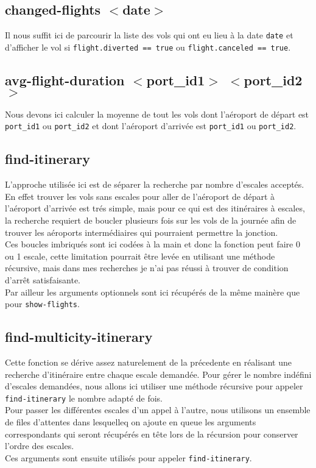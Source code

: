 \documentclass[a4paper, 12pt]{article}
\begin{document}
	\subsection{\texorpdfstring{changed-flights $<$date$>$}{}}
	Il nous suffit ici de parcourir la liste des vols qui ont eu lieu à la date \lstinline|date| et d'afficher le vol si \lstinline|flight.diverted == true| ou \lstinline|flight.canceled == true|.\\
	
	\subsection{\texorpdfstring{avg-flight-duration $<$port\_id1$>$ $<$port\_id2$>$}{}}
	Nous devons ici calculer la moyenne de tout les vols dont l'aéroport de départ est \lstinline|port_id1| ou \lstinline|port_id2| et dont l'aéroport d'arrivée est \lstinline|port_id1| ou \lstinline|port_id2|.
	
	\subsection{\texorpdfstring{find-itinerary}{PDFstring}}
	L'approche utilisée ici est de séparer la recherche par nombre d'escales acceptés. En effet trouver les vols sans escales pour aller de l'aéroport de départ à l'aéroport d'arrivée est trés simple, mais pour ce qui est des itinéraires à escales, la recherche requiert de boucler plusieurs fois sur les vols de la journée afin de trouver les aéroports intermédiaires qui pourraient permettre la jonction.\\
	Ces boucles imbriqués sont ici codées à la main et donc la fonction peut faire 0 ou 1 escale, cette limitation pourrait être levée en utilisant une méthode récursive, mais dans mes recherches je n'ai pas réussi à trouver de condition d'arrêt satisfaisante.\\
	Par ailleur les arguments optionnels sont ici récupérés de la même mainère que pour \lstinline|show-flights|.\\
	
	\subsection{find-multicity-itinerary}
	Cette fonction se dérive assez naturelement de la précedente en réalisant une recherche d'itinéraire entre chaque escale demandée. Pour gérer le nombre indéfini d'escales demandées, nous allons ici utiliser une méthode récursive pour appeler \lstinline|find-itinerary| le nombre adapté de fois.\\
	Pour passer les différentes escales d'un appel à l'autre, nous utilisons un ensemble de files d'attentes dans lesquelleq on ajoute en queue les arguments correspondants qui seront récupérés en tête lors de la récursion pour conserver l'ordre des escales.\\
	Ces arguments sont ensuite utilisés pour appeler \lstinline|find-itinerary|.\\
	
\end{document}
